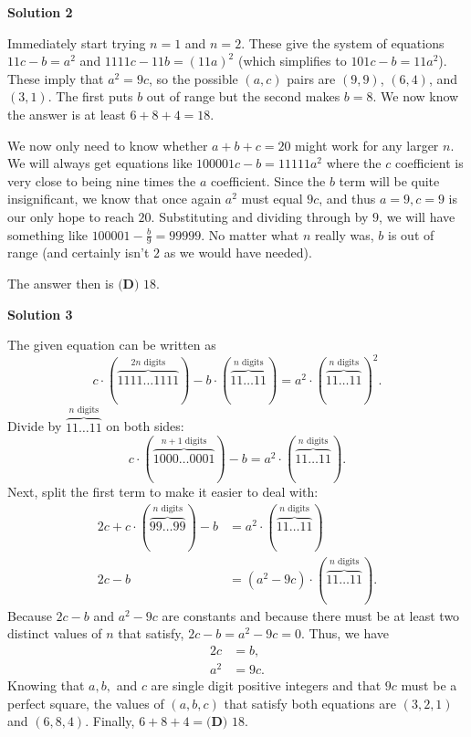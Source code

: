 \begin{enumerate}
\textbf{Solution 2}

Immediately start trying $n = 1$ and $n = 2$. These give the system of equations $11c - b = a^2$ and $1111c - 11b = (11a)^2$ (which simplifies to $101c - b = 11a^2$). These imply that $a^2 = 9c$, so the possible $(a, c)$ pairs are $(9, 9)$, $(6, 4)$, and $(3, 1)$. The first puts $b$ out of range but the second makes $b = 8$. We now know the answer is at least $6 + 8 + 4 = 18$.

 We now only need to know whether $a + b + c = 20$ might work for any larger $n$. We will always get equations like $100001c - b = 11111a^2$ where the $c$ coefficient is very close to being nine times the $a$ coefficient. Since the $b$ term will be quite insignificant, we know that once again $a^2$ must equal $9c$, and thus $a = 9, c = 9$ is our only hope to reach $20$. Substituting and dividing through by $9$, we will have something like $100001 - \frac{b}{9} = 99999$. No matter what $n$ really was, $b$ is out of range (and certainly isn't $2$ as we would have needed).

 The answer then is $\boxed{\textbf{(D) } 18}$.

 



\textbf{Solution 3}

The given equation can be written as
 \[c \cdot (\phantom{ } \overbrace{1111 \ldots 1111}^{2n\text{ digits}}\phantom{ }) - b \cdot (\phantom{ } \overbrace{11 \ldots 11}^{n\text{ digits}} \phantom{ }) = a^2 \cdot (\phantom{ } \overbrace{11 \ldots 11}^{n\text{ digits}} \phantom{ })^2.\]Divide by $\overbrace{11 \ldots 11}^{n\text{ digits}}$ on both sides:
 \[c \cdot (\phantom{ } \overbrace{1000 \ldots 0001}^{n+1\text{ digits}}\phantom{ }) - b = a^2 \cdot (\phantom{ } \overbrace{11 \ldots 11}^{n\text{ digits}} \phantom{ }).\]Next, split the first term to make it easier to deal with:
 \begin{align*} 2c + c \cdot (\phantom{ }\overbrace{99 \ldots 99}^{n\text{ digits}}\phantom{ }) - b &= a^2 \cdot (\phantom{ } \overbrace{11 \ldots 11}^{n\text{ digits}} \phantom{ }) \\ 2c - b &= (a^2 - 9c) \cdot (\phantom{ }\overbrace{11 \ldots 11}^{n\text{ digits}}\phantom{ }). \end{align*}
Because $2c - b$ and $a^2 - 9c$ are constants and because there must be at least two distinct values of $n$ that satisfy, $2c - b = a^2 - 9c = 0.$ Thus, we have
 \begin{align*} 2c&=b, \\ a^2&=9c. \end{align*}
Knowing that $a,b,$ and $c$ are single digit positive integers and that $9c$ must be a perfect square, the values of $(a,b,c)$ that satisfy both equations are $(3,2,1)$ and $(6,8,4).$ Finally, $6 + 8 + 4 = \boxed{\textbf{(D) } 18}.$





\end{enumerate}
